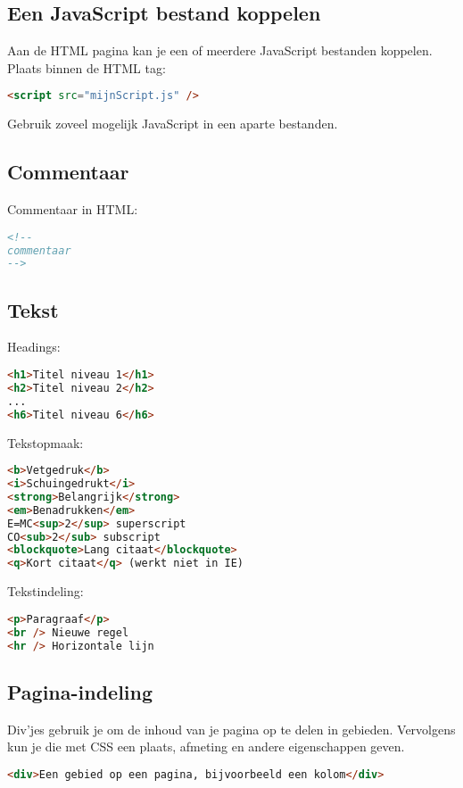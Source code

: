 \documentclass[8pt,pagesize,footinclude=false,headinclude=false]{scrartcl}
\begin{document}
\begin{multicols*}{4}
\subsection*{Een JavaScript bestand koppelen}
Aan de HTML pagina kan je een of meerdere JavaScript bestanden koppelen.\\
\noindent Plaats binnen de HTML tag:
\begin{lstlisting}[language=HTML]
	<script src="mijnScript.js" />
\end{lstlisting}
\noindent Gebruik zoveel mogelijk JavaScript in een aparte bestanden.

\subsection*{Commentaar}
Commentaar in HTML:
\begin{lstlisting}[language=HTML]
<!--
commentaar
-->
\end{lstlisting}

\subsection*{Tekst}
Headings:
\begin{lstlisting}[language=HTML]
<h1>Titel niveau 1</h1>
<h2>Titel niveau 2</h2>
...
<h6>Titel niveau 6</h6>
\end{lstlisting}

\noindent Tekstopmaak:
\begin{lstlisting}[language=HTML]
<b>Vetgedruk</b>
<i>Schuingedrukt</i>
<strong>Belangrijk</strong>
<em>Benadrukken</em>
E=MC<sup>2</sup> superscript
CO<sub>2</sub> subscript
<blockquote>Lang citaat</blockquote>
<q>Kort citaat</q> (werkt niet in IE)
\end{lstlisting}

\noindent Tekstindeling:
\begin{lstlisting}[language=HTML]
<p>Paragraaf</p>
<br /> Nieuwe regel
<hr /> Horizontale lijn
\end{lstlisting}

\subsection*{Pagina-indeling}
Div'jes gebruik je om de inhoud van je pagina op te delen in gebieden. Vervolgens kun je die met CSS een plaats, afmeting en andere eigenschappen geven. 
\begin{lstlisting}[language=HTML]
<div>Een gebied op een pagina, bijvoorbeeld een kolom</div>
\end{lstlisting}


\end{multicols*}
\end{document}

